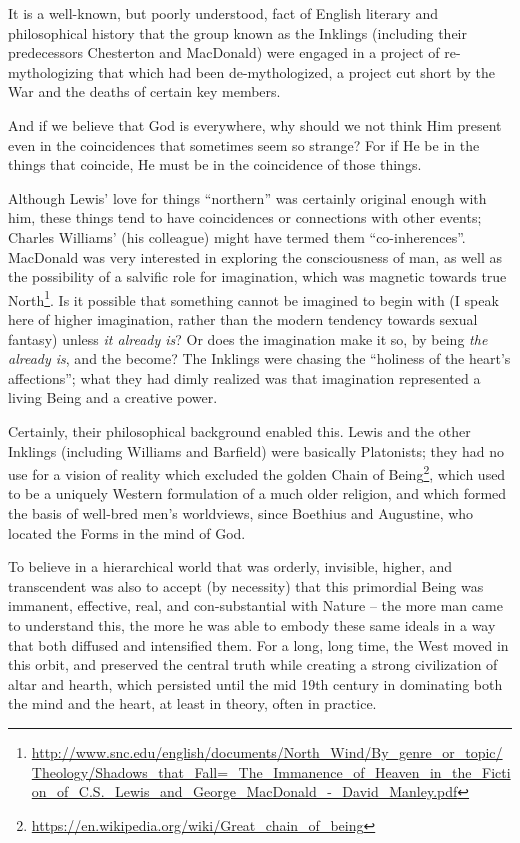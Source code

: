It is a well-known, but poorly understood, fact of English literary and philosophical history that the group known as the Inklings (including their predecessors Chesterton and MacDonald) were engaged in a project of re-mythologizing that which had been de-mythologized, a project cut short by the War and the deaths of certain key members.

\begin{quotex}
And if we believe that God is everywhere, why should we not think Him present even in the coincidences that sometimes seem so strange? For if He be in the things that coincide, He must be in the coincidence of those things.
\end{quotex}


Although Lewis' love for things ``northern'' was certainly original enough with him, these things tend to have coincidences or connections with other events; Charles Williams' (his colleague) might have termed them ``co-inherences''. MacDonald was very interested in exploring the consciousness of man, as well as the possibility of a salvific role for imagination, which was magnetic towards true North\footnote{\url{http://www.snc.edu/english/documents/North\_Wind/By\_genre\_or\_topic/Theology/Shadows\_that\_Fall=\_The\_Immanence\_of\_Heaven\_in\_the\_Fiction\_of\_C.S.\_Lewis\_and\_George\_MacDonald\_-\_David\_Manley.pdf}}. Is it possible that something cannot be imagined to begin with (I speak here of higher imagination, rather than the modern tendency towards sexual fantasy) unless \emph{it already is}? Or does the imagination make it so, by being \emph{the already is}, and the become? The Inklings were chasing the ``holiness of the heart's affections''; what they had dimly realized was that imagination represented a living Being and a creative power.

Certainly, their philosophical background enabled this. Lewis and the other Inklings (including Williams and Barfield) were basically Platonists; they had no use for a vision of reality which excluded the golden Chain of Being\footnote{\url{https://en.wikipedia.org/wiki/Great\_chain\_of\_being}}, which used to be a uniquely Western formulation of a much older religion, and which formed the basis of well-bred men's worldviews, since Boethius and Augustine, who located the Forms in the mind of God.

To believe in a hierarchical world that was orderly, invisible, higher, and transcendent was also to accept (by necessity) that this primordial Being was immanent, effective, real, and con-substantial with Nature -- the more man came to understand this, the more he was able to embody these same ideals in a way that both diffused and intensified them. For a long, long time, the West moved in this orbit, and preserved the central truth while creating a strong civilization of altar and hearth, which persisted until the mid 19th century in dominating both the mind and the heart, at least in theory, often in practice.

